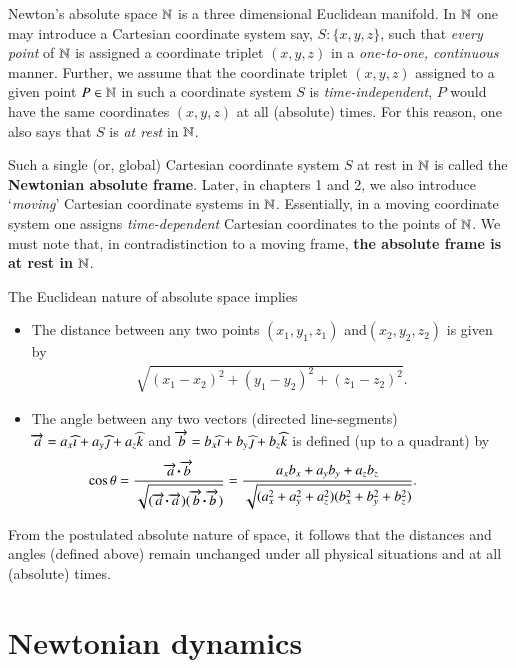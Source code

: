 Newton's absolute space $\mathbb{N}$ is a three 
dimensional Euclidean manifold.  In $\mathbb{N}$ one may 
introduce a Cartesian coordinate system say, 
$S:\{x,y,z\}$,  such that 
\textsl{every point} of $\mathbb{N}$ is assigned a 
coordinate triplet $(x,y,z)$ in a \textsl{one-to-one, 
continuous} manner.  Further, we assume that the 
coordinate triplet $(x,y,z)$ assigned to a given point 
$P\in \mathbb{N}$ in such a coordinate system $S$ is 
\textsl{time-independent}, \ie $P$ would have the same 
coordinates $(x,y,z)$ at all (absolute) times. For this 
reason, one also says that $S$ is \textsl{at rest} in 
$\mathbb{N}$.

Such a single (or, global) Cartesian coordinate 
system $S$ at rest in $\mathbb{N}$ is called the 
\textbf{Newtonian absolute frame}. 
Later, in chapters 1 and 2, we also introduce 
`\textsl{moving}' Cartesian coordinate systems in 
$\mathbb{N}$. Essentially, in a moving coordinate system 
one  assigns \textsl{time-dependent} Cartesian 
coordinates to the points of $\mathbb{N}$. We must note 
that, in contradistinction to a moving frame, 
\textbf{the absolute frame is at rest in $\mathbb{N}$}. 

\noindent The Euclidean nature of absolute space 
implies
\begin{itemize}
\item The distance between any two points $(x_1, y_1, 
z_1)$ 
and\lbk $(x_2, y_2, z_2)$ is given by
\begin{align}\label{gr.1}
\sqrt{(x_1-x_2)^2+(y_1-y_2)^2+(z_1-z_2)^2}.
\end{align}
\item The angle between any two vectors (directed 
line-segments) $\overrightarrow{a}=a_x{\widehat{\imath}}+a_y{\widehat{\jmath}}+a_z{\widehat{k}}$ and 
$\overrightarrow{b} =b_x{\widehat{\imath}} + b_y{\widehat{\jmath}} + b_z{\widehat{k}}$ is defined (up 
to a 
quadrant) by
\begin{align} \label{gr.2}
\hspace*{-6mm}\cos\theta&=\frac{\vec{a}\dotp\vec{b}}
{\sqrt{(\vec{a}\dotp\vec{a})(\vec{b}\dotp\vec{b})}} =  
 \frac{a_xb_x+a_yb_ y+a_zb_z}
{\sqrt{ (a_x^2+a_y^2+a_z^2)(b_x^2+b_y^2+b_z^2) }}.
\end{align}
\end{itemize}
From the postulated absolute nature of space, it 
follows that the distances and angles (defined above) 
remain unchanged under all physical situations and at 
all (absolute) times.

\section{Newtonian dynamics}

